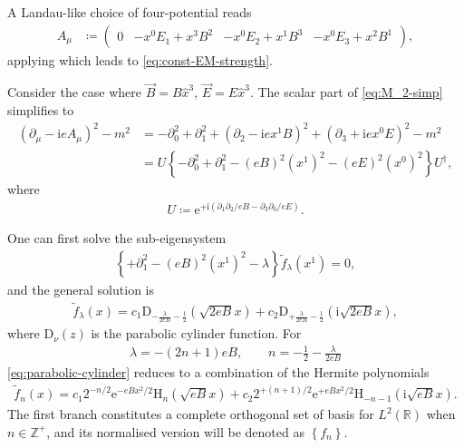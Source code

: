 \documentclass[12pt]{article}
\newcommand\mi{\mathrm{i}} %
\newcommand\me{\mathrm{e}} %
\newcommand{\rbr}[1]{{\left(#1\right)}}
\newcommand{\cbr}[1]{{\left\{#1\right\}}}
\newcommand{\rfun}[2]{{#1}\mathopen{}\left(#2\right)\mathclose{}}
\begin{document}
A Landau-like choice of four-potential \citep{landau1930} reads
\begin{align}
A_{\mu} &\coloneqq \begin{pmatrix} 0 &
-x^0 E_1 + x^3 B^2 &
-x^0 E_2 + x^1 B^3 &
-x^0 E_3 + x^2 B^1 \end{pmatrix}, %
\end{align}
applying which leads to \cref{eq:const-EM-strength}.

Consider the case where $\vec B = B \hat x^3$, $\vec E = E \hat x^3$. 
The scalar part of \cref{eq:M_2-simp} simplifies to
\begin{align}
\rbr{\partial_\mu - \mi e A_\mu}^2 - m^2 &=
-\partial_0^2 + \partial_1^2 + \rbr{\partial_2 - \mi e x^1 B}^2
+\rbr{\partial_3 + \mi e x^0 E}^2 - m^2 \nonumber \\
&= U \cbr{-\partial_0^2 + \partial_1^2 - \rbr{eB}^2 \rbr{x^1}^2 -
\rbr{eE}^2 \rbr{x^0}^2} U^\dagger,
\label{eq:scalar-part-M_2}
\end{align}
where
\begin{align}
U \coloneqq \me^{+\mi\rbr{\partial_1\partial_2/eB-\partial_3\partial_0/eE}}.
\end{align}

One can first solve the sub-eigensystem
\begin{align}
\cbr{+\partial_1^2 - \rbr{eB}^2 \rbr{x^1}^2 - \lambda}
\rfun{\tilde{f}_\lambda}{x^1} = 0,
\end{align}
and the general solution is
\begin{align}
\rfun{\tilde{f}_\lambda}{x}
= c_1 \rfun{\mathrm{D}_{-\frac{\lambda}{2eB}-\frac{1}{2}}}{\sqrt{2eB}x}
+ c_2 \rfun{\mathrm{D}_{+\frac{\lambda}{2eB}-\frac{1}{2}}}{\mi\sqrt{2eB}x},
\label{eq:parabolic-cylinder}
\end{align}
where $\rfun{\mathrm{D}_\nu}{z}$ is the parabolic cylinder function. For
\begin{align}
\lambda = -(2n+1)eB,\qquad n = -\frac{1}{2}-\frac{\lambda}{2eB}
\end{align}
\cref{eq:parabolic-cylinder} reduces to a combination of the Hermite polynomials
\begin{align}
\rfun{\tilde{f}_n}{x}
= c_1 2^{-n/2}\me^{-eBx^2/2}\rfun{\mathrm{H}_n}{\sqrt{eB}x}
+ c_2 2^{+\rbr{n+1}/2}\me^{+eBx^2/2}\rfun{\mathrm{H}_{-n-1}}{\mi\sqrt{eB}x}.
\end{align}
The first branch constitutes a complete orthogonal set of basis for 
$\rfun{L^2}{\mathbb{R}}$ when $n\in\mathbb{Z}^+$, and its normalised version 
will be denoted as $\cbr{f_n}$.
\end{document}
